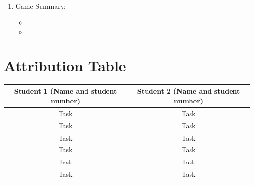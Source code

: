 \documentclass{article}
\begin{document}
\begin{enumerate}
\begin{enumerate}
    \end{enumerate}

    

\begin{figure}[ht!]
    \centering
    \caption{caption}
    \label{Instructions}
\end{figure}

\item Game Summary:
\begin{itemize}
\item
\item
\end{itemize}

    
\end{enumerate}

\section{Attribution Table}

\begin{center}
\begin{tabular}{|| c | c ||}
\hline
 Student 1 (Name and student number) &  Student 2 (Name and student number) \\ 
 \hline
 Task & Task\\
 \hline
 Task & Task\\
 \hline
 Task & Task\\ 
 \hline
 Task & Task\\ 
 \hline
 Task & Task\\
 \hline
 Task & Task\\  
 \hline
\end{tabular}
\end{center}

\end{document}
